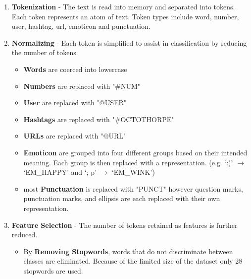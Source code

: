 \documentclass[12pt]{article}
\begin{document}
\begin{enumerate}

    \item \textbf{Tokenization} - The text is read into memory and separated into
        tokens. Each token represents an atom of text. Token types include
        word, number, user, hashtag, url, emoticon and punctuation.

    \item \textbf{Normalizing} - Each token is simplified to assist in
        classification by reducing the number of tokens.

        \begin{itemize}

            \item \textbf{Words} are coerced into lowercase

            \item \textbf{Numbers} are replaced with "\#NUM"

            \item \textbf{User} are replaced with "@USER"

            \item \textbf{Hashtags} are replaced with "\#OCTOTHORPE"

            \item \textbf{URLs} are replaced with "@URL"

            \item \textbf{Emoticon} are grouped into four different groups
                based on their intended meaning. Each group is then replaced
                with a representation. (e.g. `:)' $\rightarrow$ `EM\_HAPPY' and
                `;-p' $\rightarrow$ `EM\_WINK')

            \item most \textbf{Punctuation} is replaced with "PUNCT" however
                question marks, punctuation marks, and ellipsis are each
                replaced with their own representation.

        \end{itemize}

    \item \textbf{Feature Selection} - The number of tokens retained as
        features is further reduced.
        \begin{itemize}

            \item By \textbf{Removing Stopwords}, words that do not
                discriminate between classes are eliminated. Because of the
                limited size of the dataset only 28 stopwords are used.


\end{itemize}
\end{enumerate}
\end{document}
